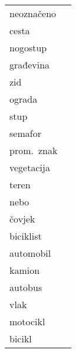 \documentclass{beamer}
\begin{document}
\begin{frame}{}
{{{\begin{minipage}[b][6.3579cm]{2.0cm}
{\begin{minipage}[b]{1.5cm}
\begin{tabu} {@{}X[1,r,m]@{} @{}X[-1,c,m]@{}}
							neoznačeno &\vspace{0.5cm} \\
							cesta &\vspace{0.5cm} \\
							nogostup &\vspace{0.5cm} \\
							građevina &\vspace{0.5cm} \\
							zid &\vspace{0.5cm} \\
							ograda &\vspace{0.5cm} \\
							stup &\vspace{0.5cm} \\
							semafor &\vspace{0.5cm} \\
							prom.~znak &\vspace{0.5cm} \\
							vegetacija &\vspace{0.5cm} \\			
							teren &\vspace{0.5cm} \\			
							nebo &\vspace{0.5cm} \\			
							čovjek &\vspace{0.5cm} \\			
							biciklist &\vspace{0.5cm} \\
							automobil &\vspace{0.5cm} \\
							kamion &\vspace{0.5cm} \\			
							autobus &\vspace{0.5cm} \\			
							vlak &\vspace{0.5cm} \\	
							motocikl &\vspace{0.5cm} \\	
							bicikl &\vspace{0.5cm} \\
						\end{tabu}
					\end{minipage}
				}
			\end{minipage}
		}
}}
\end{frame}
\end{document}
